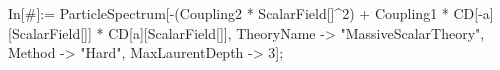 In[#]:= ParticleSpectrum[-(Coupling2 * ScalarField[]^2) + Coupling1 * CD[-a][ScalarField[]] * CD[a][ScalarField[]], TheoryName -> "MassiveScalarTheory", Method -> "Hard", MaxLaurentDepth -> 3]; 
